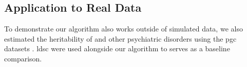 	
	\subsection{Application to Real Data}
	\label{sec:realData}
	To demonstrate our algorithm also works outside of simulated data, we also estimated the heritability of  and other psychiatric disorders using the \gls{pgc} datasets \citep{Ripke2014,PsychiatricGWASConsortiumBipolarDisorderWorkingGroup2011,Ripke2013b}.
	\gls{ldsc} were used alongside our algorithm to serves as a baseline comparison.
	
